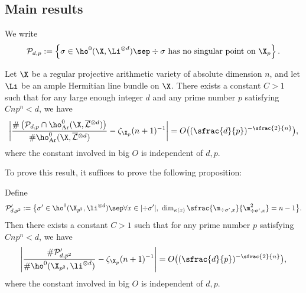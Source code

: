 \subsection{Main results}
We write
\[
\mathcal{P}_{d,p}:=\left\{ \sigma\in \ho^0(\X, \Li^{\otimes d})\sep \div \sigma \text{ has no singular point on } \X_p \right\}.
\]

\begin{thm}\label{fiber}
Let $\X$ be a regular projective arithmetic variety of absolute dimension $n$, and let $\Li$ be an ample Hermitian line bundle on $\X$.
There exists a constant $C>1$ such that for any large enough integer $d$ and any prime number $p$ satisfying $Cnp^n<d$, we have
\[
\biggl| \frac{\#\left(\mathcal{P}_{d,p} \cap \ho^0_{\mathrm{Ar}}(\X, \overline{\mathcal{L}}{}^{\otimes d})\right)}{\#\ho^0_{\mathrm{Ar}}(\X, \overline{\mathcal{L}}{}^{\otimes d})} -\zeta_{\X_p}(n+1)^{-1} \biggr|=O\bigl((\sfrac{d}{p})^{-\sfrac{2}{n}} \bigr),
\]
where the constant involved in big $O$ is independent of $d,p$.
\end{thm}

To prove this result, it suffices to prove the following proposition:

\begin{prop}\label{fib}
Define
\[
\mathcal{P}'_{d,p^2}:=\bigl\{ \sigma'\in \ho^0(\X_{p^2}, \li^{\otimes d})\sep \forall x\in |{\div\sigma'}|,\ \dim_{\kappa(x)}\sfrac{\m_{\div \sigma',x}}{\m^2_{\div \sigma', x}}=n-1 \bigr\}.
\]
Then there exists a constant $C>1$ such that for any prime number $p$ satisfying $Cnp^n<d$, we have
\[
\left| \frac{\#\mathcal{P}'_{d,p^2}}{\#\ho^0(\X_{p^2}, \li^{\otimes d})} -\zeta_{\X_p}(n+1)^{-1} \right|=O\bigl((\sfrac{d}{p})^{-\sfrac{2}{n}} \bigr),
\]
where the constant involved in big $O$ is independent of $d,p$.
\end{prop}

